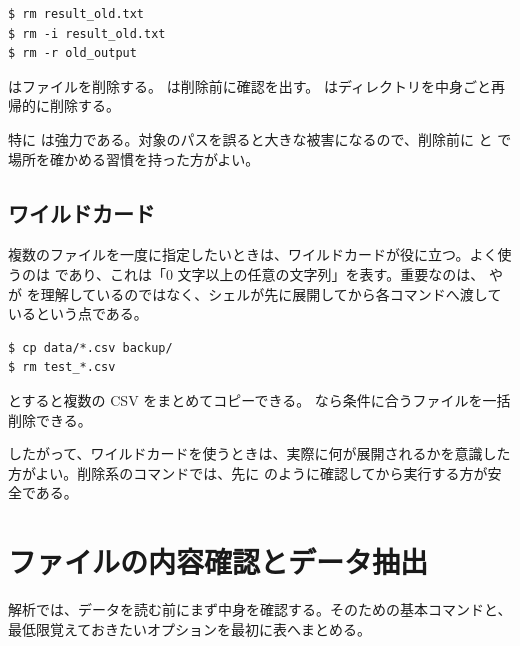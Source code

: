 \begin{lstlisting}[numbers=none, xleftmargin=2\zw]
$ rm result_old.txt
$ rm -i result_old.txt
$ rm -r old_output
\end{lstlisting}

 はファイルを削除する。 は削除前に確認を出す。 はディレクトリを中身ごと再帰的に削除する。

特に  は強力である。対象のパスを誤ると大きな被害になるので、削除前に  と  で場所を確かめる習慣を持った方がよい。

\subsection{ワイルドカード}

複数のファイルを一度に指定したいときは、ワイルドカードが役に立つ。よく使うのは \code{*} であり、これは「0 文字以上の任意の文字列」を表す。重要なのは、 や  が \code{*} を理解しているのではなく、シェルが先に展開してから各コマンドへ渡しているという点である。

\begin{lstlisting}[numbers=none, xleftmargin=2\zw]
$ cp data/*.csv backup/
$ rm test_*.csv
\end{lstlisting}

 とすると複数の CSV をまとめてコピーできる。 なら条件に合うファイルを一括削除できる。

したがって、ワイルドカードを使うときは、実際に何が展開されるかを意識した方がよい。削除系のコマンドでは、先に  のように確認してから実行する方が安全である。


\section{ファイルの内容確認とデータ抽出}

解析では、データを読む前にまず中身を確認する。そのための基本コマンドと、最低限覚えておきたいオプションを最初に表へまとめる。

